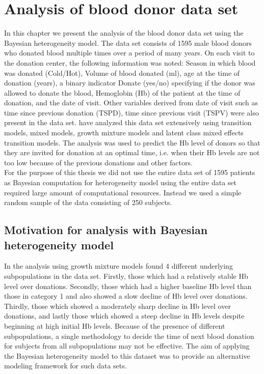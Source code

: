 
\chapter{Analysis of blood donor data set}
\label{ch : blood_donor}
 
 In this chapter we present the analysis of the blood donor data set \citep{nasserinejad_prevalence_2015} using the Bayesian heterogeneity model. The data set consists of 1595 male blood donors who donated blood multiple times over a period of many years. On each visit to the donation center, the following information was noted: Season in which blood was donated (Cold/Hot), Volume of blood donated (ml), age at the time of donation (years), a binary indicator Donate (yes/no) specifying if the donor was allowed to donate the blood, Hemoglobin (Hb) of the patient at the time of donation, and the date of visit. Other variables derived from date of visit such as time since previous donation (TSPD), time since previous visit (TSPV) were also present in the data set. \citet{nasserinejad_predicting_2013,nasserinejad_prevalence_2015,nasserinejad_prediction_2016} have analyzed this data set extensively using transition models, mixed models, growth mixture models and latent class mixed effects transition models. The analysis was used to predict the Hb level of donors so that they are invited for donation at an optimal time, i.e. when their Hb levels are not too low because of the previous donations and other factors.\\

 For the purpose of this thesis we did not use the entire data set of 1595 patients as Bayesian computation for heterogeneity model using the entire data set required large amount of computational resources. Instead we used a simple random sample of the data consisting of 250 subjects.

\section{Motivation for analysis with Bayesian heterogeneity model}
 In the analysis using growth mixture models \citet{nasserinejad_prevalence_2015} found 4 different underlying subpopulations in the data set. Firstly, those which had a relatively stable Hb level over donations. Secondly, those which had a higher baseline Hb level than those in category 1 and also showed a slow decline of Hb level over donations. Thirdly, those which showed a moderately sharp decline in Hb level over donations, and lastly those which showed a steep decline in Hb levels despite beginning at high initial Hb levels. Because of the presence of different subpopulations, a single methodology to decide the time of next blood donation for subjects from all subpopulations may not be effective. The aim of applying the Bayesian heterogeneity model to this dataset was to provide an alternative modeling framework for such data sets.

